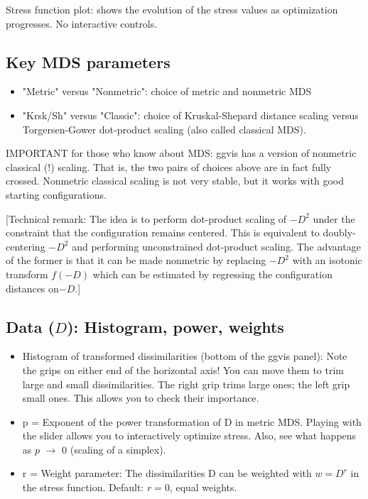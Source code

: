 \documentclass[11pt]{article}
\begin{document}
Stress function plot: shows the evolution of the stress values as
optimization progresses.  No interactive controls. 

\subsection{Key MDS parameters}

\begin{itemize}

\item
"Metric" versus "Nonmetric": choice of metric and nonmetric MDS
\item
"Krsk/Sh" versus "Classic": choice of Kruskal-Shepard distance scaling
   versus Torgersen-Gower dot-product scaling (also called classical MDS).
\end{itemize}

IMPORTANT for those who know about MDS: ggvis has a version of
   nonmetric classical (!) scaling.  That is, the two pairs of choices
   above are in fact fully crossed.  Nonmetric classical scaling is
   not very stable, but it works with good starting configurations.

   [Technical remark: The idea is to perform dot-product scaling of
   $-D^2$ under the constraint that the configuration remains centered.
   This is equivalent to doubly-centering $-D^2$ and performing
   unconstrained dot-product scaling.  The advantage of the former is
   that it can be made nonmetric by replacing $-D^2$ with an isotonic
   transform $f(-D)$ which can be estimated by regressing the
   configuration distances on$ -D$.]

\subsection{Data ($D$): Histogram, power, weights}

\begin{itemize}
\item
Histogram of transformed dissimilarities (bottom of the ggvis panel):
   Note the grips on either end of the horizontal axis!  You can move
   them to trim large and small dissimilarities.  The right grip trims
   large ones; the left grip small ones.  This allows you to check
   their importance.
\item
p = Exponent of the power transformation of D in metric MDS.
    Playing with the slider allows you to interactively optimize stress.
    Also, see what happens as $p$ $\rightarrow$ 0 (scaling of a simplex).
\item
r = Weight parameter: The dissimilarities D can be weighted with $w=D^r$
    in the stress function.  Default: $r=0$, equal weights.
\end{itemize}
\end{document}
